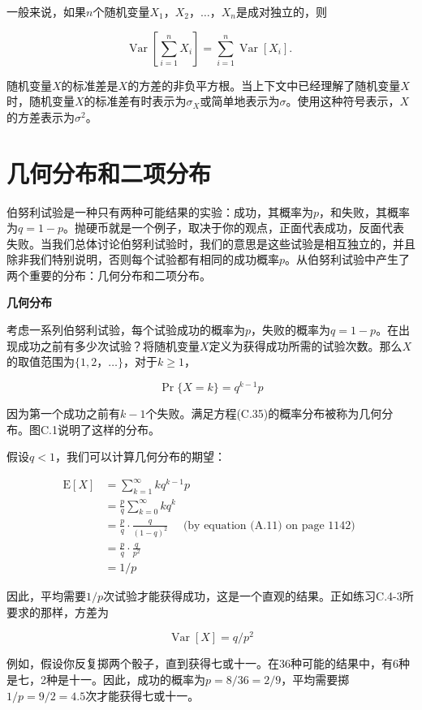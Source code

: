 \documentclass[lang=cn,newtx,10pt,scheme=chinese]{elegantbook}
\begin{document}
一般来说，如果$n$个随机变量$X_1，X_2，\ldots，X_n$是成对独立的，则

$$
\operatorname{Var}\left[\sum_{i=1}^n X_i\right]=\sum_{i=1}^n \operatorname{Var}\left[X_i\right] \text {. }
$$

随机变量$X$的标准差是$X$的方差的非负平方根。当上下文中已经理解了随机变量$X$时，随机变量$X$的标准差有时表示为$\sigma_X$或简单地表示为$\sigma$。使用这种符号表示，$X$的方差表示为$\sigma^2$。

\section{几何分布和二项分布}

伯努利试验是一种只有两种可能结果的实验：成功，其概率为$p$，和失败，其概率为$q=1-p$。抛硬币就是一个例子，取决于你的观点，正面代表成功，反面代表失败。当我们总体讨论伯努利试验时，我们的意思是这些试验是相互独立的，并且除非我们特别说明，否则每个试验都有相同的成功概率$p$。从伯努利试验中产生了两个重要的分布：几何分布和二项分布。

\textbf{几何分布}

考虑一系列伯努利试验，每个试验成功的概率为$p$，失败的概率为$q=1-p$。在出现成功之前有多少次试验？将随机变量$X$定义为获得成功所需的试验次数。那么$X$的取值范围为$\{1,2，\ldots\}$，对于$k \geq 1$，

$$
\operatorname{Pr}\{X=k\}=q^{k-1} p
$$

因为第一个成功之前有$k-1$个失败。满足方程(C.35)的概率分布被称为几何分布。图C.1说明了这样的分布。

假设$q<1$，我们可以计算几何分布的期望：

$$
\begin{aligned}
\mathrm{E}[X] & =\sum_{k=1}^{\infty} k q^{k-1} p \\
& =\frac{p}{q} \sum_{k=0}^{\infty} k q^k \\
& =\frac{p}{q} \cdot \frac{q}{(1-q)^2} \quad \text { (by equation (A.11) on page 1142) } \\
& =\frac{p}{q} \cdot \frac{q}{p^2} \\
& =1 / p
\end{aligned}
$$

因此，平均需要$1 / p$次试验才能获得成功，这是一个直观的结果。正如练习C.4-3所要求的那样，方差为

$$
\operatorname{Var}[X]=q / p^2
$$

例如，假设你反复掷两个骰子，直到获得七或十一。在36种可能的结果中，有6种是七，2种是十一。因此，成功的概率为$p=8 / 36=2 / 9$，平均需要掷$1 / p=9 / 2=4.5$次才能获得七或十一。
\end{document}
